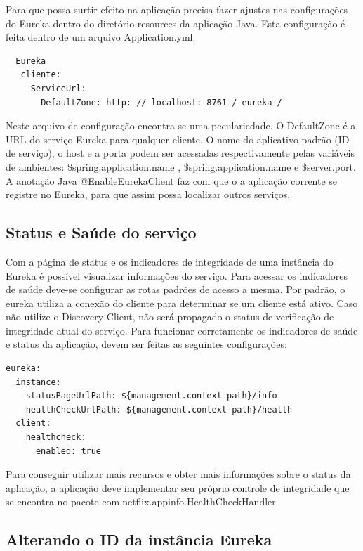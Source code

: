 Para que possa surtir efeito na aplicação precisa fazer ajustes nas configurações do Eureka dentro do diretório resources da aplicação Java. Esta configuração é feita dentro de um arquivo Application.yml.

\begin{verbatim}
  Eureka
   cliente:
     ServiceUrl:
       DefaultZone: http: // localhost: 8761 / eureka / 
\end{verbatim}

Neste arquivo de configuração encontra-se uma peculariedade. O DefaultZone é a URL do serviço Eureka para qualquer cliente. O nome do aplicativo padrão (ID de serviço), o host e a porta podem ser acessadas respectivamente pelas variáveis de ambientes: \${spring.application.name} , \${spring.application.name} e \${server.port}.
A anotação Java @EnableEurekaClient faz com que o a aplicação corrente se registre no Eureka, para que assim possa localizar outros serviços.

\subsection{Status e Saúde do serviço}

Com a página de status e os indicadores de integridade de uma instância do Eureka é possível visualizar informações do serviço. Para acessar os indicadores de saúde deve-se configurar as rotas padrões de acesso a mesma. Por padrão, o eureka utiliza a conexão do cliente para determinar se um cliente está ativo. Caso não utilize o Discovery Client, não será propagado o status de verificação de integridade atual do serviço. Para funcionar corretamente os indicadores de saúde e status da aplicação, devem ser feitas as seguintes configurações:

\begin{verbatim}
eureka:
  instance:
    statusPageUrlPath: ${management.context-path}/info
    healthCheckUrlPath: ${management.context-path}/health
  client:
    healthcheck:
      enabled: true
\end{verbatim}

Para conseguir utilizar mais recursos e obter mais informações sobre o status da aplicação, a aplicação deve implementar seu próprio controle de integridade que se encontra no pacote com.netflix.appinfo.HealthCheckHandler

\subsection{Alterando o ID da instância Eureka}

